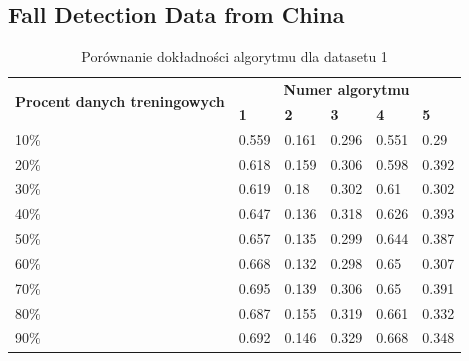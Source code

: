 \documentclass[a4paper,11pt]{article}
\begin{document}
\subsection{Fall Detection Data from China}
\begin{table}[H]
\centering
\begin{tabular}{|l|l|l|l|l|l|}
\hline
\multicolumn{1}{|c|}{\multirow{2}{*}{\textbf{Procent danych treningowych}}} & \multicolumn{5}{c|}{\textbf{Numer algorytmu}}                       \\ \cline{2-6}
\multicolumn{1}{|c|}{}                                                      & \textbf{1} & \textbf{2} & \textbf{3} & \textbf{4} & \textbf{5} \\ \hline
10\%                                                                        & 0.559       & 0.161       & 0.296       & 0.551       & 0.29        \\ \hline
20\%                                                                        & 0.618       & 0.159       & 0.306       & 0.598       & 0.392       \\ \hline
30\%                                                                        & 0.619       & 0.18        & 0.302       & 0.61        & 0.302       \\ \hline
40\%                                                                        & 0.647       & 0.136       & 0.318       & 0.626       & 0.393       \\ \hline
50\%                                                                        & 0.657       & 0.135       & 0.299       & 0.644       & 0.387       \\ \hline
60\%                                                                        & 0.668       & 0.132       & 0.298       & 0.65        & 0.307       \\ \hline
70\%                                                                        & 0.695       & 0.139       & 0.306       & 0.65        & 0.391       \\ \hline
80\%                                                                        & 0.687       & 0.155       & 0.319       & 0.661       & 0.332       \\ \hline
90\%                                                                        & 0.692       & 0.146       & 0.329       & 0.668       & 0.348       \\ \hline
\end{tabular}
\caption{Porównanie dokładności algorytmu dla datasetu 1}
\label{tab:dataset1}
\end{table}
\end{document}

